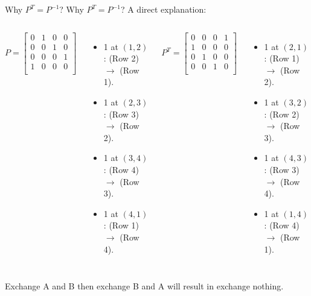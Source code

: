 \documentclass{beamer}
\begin{document}
\begin{frame}{Why $P^T=P^{-1}$?}
Why $P^T=P^{-1}$? A direct explanation:
\vspace{3pt}

\begin{columns}
\begin{equation*}
    P=\left[ \begin{matrix}
        0&		1&		0&		0\\
        0&		0&		1&		0\\
        0&		0&		0&		1\\
        1&		0&		0&		0\\
    \end{matrix} \right]
\end{equation*}

\begin{itemize}
    \item 1 at $(1,2)$: (Row 2) $\rightarrow$ (Row 1).
    \item 1 at $(2,3)$: (Row 3) $\rightarrow$ (Row 2).
    \item 1 at $(3,4)$: (Row 4) $\rightarrow$ (Row 3).
    \item 1 at $(4,1)$: (Row 1) $\rightarrow$ (Row 4).
\end{itemize}

\begin{equation*}
    P^T=\left[ \begin{matrix}
        0&		0&		0&		1\\
        1&		0&		0&		0\\
        0&		1&		0&		0\\
        0&		0&		1&		0\\
    \end{matrix} \right]
\end{equation*}

\begin{itemize}
    \item 1 at $(2,1)$: (Row 1) $\rightarrow$ (Row 2).
    \item 1 at $(3,2)$: (Row 2) $\rightarrow$ (Row 3).
    \item 1 at $(4,3)$: (Row 3) $\rightarrow$ (Row 4).
    \item 1 at $(1,4)$: (Row 4) $\rightarrow$ (Row 1).
\end{itemize}
\end{columns}

\vspace{7pt}
Exchange A and B then exchange B and A will result in exchange nothing.

\end{frame}
\end{document}

